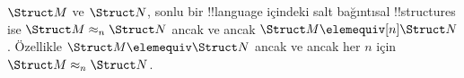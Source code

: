 \documentclass[../../../include/open-logic-section]{subfiles}
\begin{document}
\begin{cor}
  $\Struct M$ ve $\Struct N$, sonlu bir !!{language} içindeki salt
  bağıntısal !!{structure}s ise $\Struct M\approx_n\Struct N$ ancak ve
  ancak $\Struct M\elemequiv[n]\Struct N$. Özellikle
  $\Struct M\elemequiv\Struct N$ ancak ve ancak her $n$ için
  $\Struct M\approx_n\Struct N$.
\end{cor}
\end{document}
